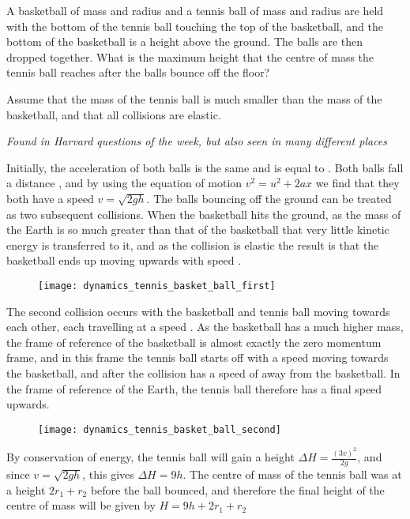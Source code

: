 
\begin{problem}[Superball] 
{A basketball of mass  and radius   and a tennis ball of  mass  and radius  are held with the bottom of the tennis ball touching the top of the basketball, and the bottom of the basketball is a height  above the ground. The balls are then dropped together. What is the maximum height that the centre of mass the tennis ball reaches after the balls bounce off the floor?

Assume that the mass of the tennis ball is much smaller than the mass of the basketball, and that all collisions are elastic.
}
{\textit{Found in Harvard questions of the week, but also seen in many different places}}
{Initially, the acceleration of both balls is the same and is equal to . Both balls fall a distance  , and by using the equation of motion $v^2 = u^2 + 2ax$ we find that they both have a speed $v = \sqrt{2gh}$. The balls bouncing off the ground can be treated as two subsequent collisions. When the basketball hits the ground, as the mass of the Earth is so much greater than that of the basketball that very little kinetic energy is transferred to it, and as the collision is elastic the result is that the basketball ends up moving upwards with speed .

\begin{figure}[h]
\centering
\texttt{[image: dynamics\_tennis\_basket\_ball\_first]}
\caption{}
\label{fig:dynamics_tennis_basket_first}
\end{figure}

The second collision occurs with the basketball and tennis ball moving towards each other, each travelling at a speed . As the basketball has a much higher mass, the frame of reference of the basketball is almost exactly the zero momentum frame, and in this frame the tennis ball starts off with a speed  moving towards the basketball, and after the collision has a speed of  away from the basketball. In the frame of reference of the Earth, the tennis ball therefore has a final speed  upwards.

\begin{figure}[h]
\centering
\texttt{[image: dynamics\_tennis\_basket\_ball\_second]}
\caption{}
\label{fig:dynamics_tennis_basket_second}
\end{figure}


By conservation of energy, the tennis ball will gain a height $\Delta H = \frac{(3v)^2}{2g}$, and since $v = \sqrt{2gh}$, this gives $\Delta H = 9h$. The centre of mass of the tennis ball was at a height $2r_1 + r_2$ before the ball bounced, and therefore the final height of the centre of mass will be given by $H = 9h + 2r_1 + r_2$
}
\end{problem}